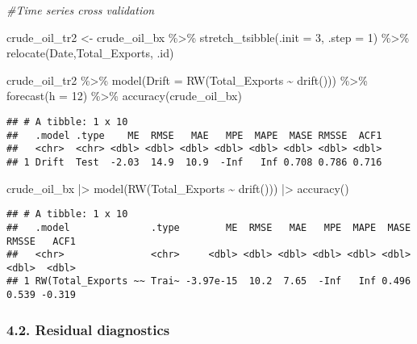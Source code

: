 \documentclass[
]{article}
\newenvironment{Shaded}{\begin{snugshade}}{\end{snugshade}}
\newcommand{\AttributeTok}[1]{\textcolor[rgb]{0.77,0.63,0.00}{#1}}
\newcommand{\CommentTok}[1]{\textcolor[rgb]{0.56,0.35,0.01}{\textit{#1}}}
\newcommand{\DecValTok}[1]{\textcolor[rgb]{0.00,0.00,0.81}{#1}}
\newcommand{\FunctionTok}[1]{\textcolor[rgb]{0.00,0.00,0.00}{#1}}
\newcommand{\NormalTok}[1]{#1}
\newcommand{\OtherTok}[1]{\textcolor[rgb]{0.56,0.35,0.01}{#1}}
\newcommand{\SpecialCharTok}[1]{\textcolor[rgb]{0.00,0.00,0.00}{#1}}
\begin{document}
\begin{Shaded}
\begin{Highlighting}[]
\CommentTok{\#Time series cross validation}

\NormalTok{crude\_oil\_tr2 }\OtherTok{\textless{}{-}}\NormalTok{ crude\_oil\_bx }\SpecialCharTok{\%\textgreater{}\%}
\FunctionTok{stretch\_tsibble}\NormalTok{(}\AttributeTok{.init =} \DecValTok{3}\NormalTok{, }\AttributeTok{.step =} \DecValTok{1}\NormalTok{) }\SpecialCharTok{\%\textgreater{}\%}
\FunctionTok{relocate}\NormalTok{(Date,Total\_Exports, .id)}

\NormalTok{crude\_oil\_tr2 }\SpecialCharTok{\%\textgreater{}\%}
\FunctionTok{model}\NormalTok{(}\AttributeTok{Drift =} \FunctionTok{RW}\NormalTok{(Total\_Exports }\SpecialCharTok{\textasciitilde{}} \FunctionTok{drift}\NormalTok{())) }\SpecialCharTok{\%\textgreater{}\%}
\FunctionTok{forecast}\NormalTok{(}\AttributeTok{h =} \DecValTok{12}\NormalTok{) }\SpecialCharTok{\%\textgreater{}\%}
\FunctionTok{accuracy}\NormalTok{(crude\_oil\_bx)}
\end{Highlighting}
\end{Shaded}

\begin{verbatim}
## # A tibble: 1 x 10
##   .model .type    ME  RMSE   MAE   MPE  MAPE  MASE RMSSE  ACF1
##   <chr>  <chr> <dbl> <dbl> <dbl> <dbl> <dbl> <dbl> <dbl> <dbl>
## 1 Drift  Test  -2.03  14.9  10.9  -Inf   Inf 0.708 0.786 0.716
\end{verbatim}

\begin{Shaded}
\begin{Highlighting}[]
\NormalTok{crude\_oil\_bx }\SpecialCharTok{|\textgreater{}}
  \FunctionTok{model}\NormalTok{(}\FunctionTok{RW}\NormalTok{(Total\_Exports }\SpecialCharTok{\textasciitilde{}} \FunctionTok{drift}\NormalTok{())) }\SpecialCharTok{|\textgreater{}}
  \FunctionTok{accuracy}\NormalTok{()}
\end{Highlighting}
\end{Shaded}

\begin{verbatim}
## # A tibble: 1 x 10
##   .model              .type        ME  RMSE   MAE   MPE  MAPE  MASE RMSSE   ACF1
##   <chr>               <chr>     <dbl> <dbl> <dbl> <dbl> <dbl> <dbl> <dbl>  <dbl>
## 1 RW(Total_Exports ~~ Trai~ -3.97e-15  10.2  7.65  -Inf   Inf 0.496 0.539 -0.319
\end{verbatim}

\hypertarget{residual-diagnostics}{%
\subsubsection{4.2. Residual diagnostics}\label{residual-diagnostics}}
\end{document}
